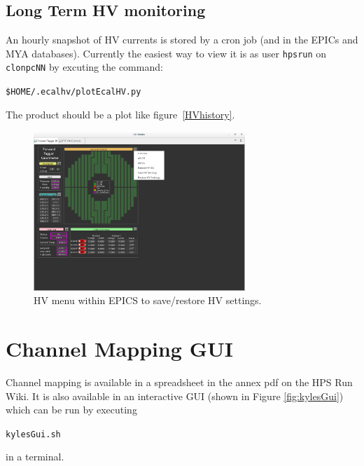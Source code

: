 \documentclass[12pt]{article}
\begin{document}
   \subsection{Long Term HV monitoring}

   An hourly snapshot of HV currents is stored by a cron job (and in the EPICs and MYA databases).  Currently the easiest way to view it is as user \texttt{hpsrun} on \texttt{clonpcNN} by excuting the command:
   \begin{center}
   \texttt{\$HOME/.ecalhv/plotEcalHV.py}
   \end{center}
The product should be a plot like figure~\ref{HVhistory}.

\begin{figure}[htbp]\centering
    \includegraphics[width=8cm]{Images/FTC_HV_menu.png}
    \caption{HV menu within EPICS to save/restore HV settings.  \label{fig:hvrestore}}
\end{figure}


\section{Channel Mapping GUI}
Channel mapping is available in a spreadsheet in the annex pdf on the HPS Run Wiki. It is also available in an interactive GUI (shown in Figure \ref{fig:kylesGui}) which can be run by executing \begin{center}\texttt{kylesGui.sh}\end{center} in a terminal.
\end{document}
